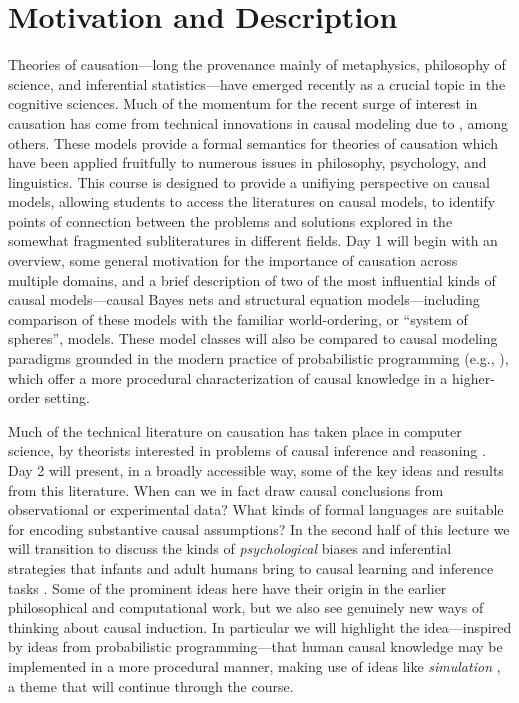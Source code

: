 \documentclass[english]{article}
\begin{document}
\section*{\large{Motivation and Description}}

Theories of causation---long the provenance mainly of metaphysics, philosophy of science, and inferential statistics---have emerged recently as a crucial topic in the cognitive sciences. Much of the momentum for the recent surge of interest in causation has come from technical innovations in causal modeling due to \citet{spirtes93,pearl00}, among others. These models provide a formal semantics for theories of causation which have been applied fruitfully to numerous issues in philosophy, psychology, and linguistics. This course is designed to provide a unifiying perspective on causal models, allowing students to access the literatures on causal models, to identify points of connection between the problems and solutions explored in the somewhat fragmented subliteratures in different fields. Day 1 will begin with an overview, some general motivation for the importance of causation across multiple domains, and a brief description of two of the most influential kinds of causal models---causal Bayes nets and structural equation models---including comparison of these models with the familiar world-ordering, or ``system of spheres'', models. These model classes will also be compared to causal modeling paradigms grounded in the modern practice of probabilistic programming (e.g., \citealt{goodmanetal15}), which offer a more procedural characterization of causal knowledge in a higher-order setting. 

Much of the technical literature on causation has taken place in computer science, by theorists interested in problems of causal inference and reasoning \citep{spirtes93,pearl00,Peters,BCII2020}. Day 2 will present, in a broadly accessible way, some of the key ideas and results from this literature. When can we in fact draw causal conclusions from observational or experimental data? What kinds of formal languages are suitable for encoding substantive causal assumptions? In the second half of this lecture we will transition to discuss the kinds of \emph{psychological} biases and inferential strategies that infants and adult humans bring to causal learning and inference tasks \citep{glymour01,gopnik04,gopnikschultz07}. Some of the prominent ideas here have their origin in the earlier philosophical and computational work, but we also see genuinely new ways of thinking about causal induction. In particular we will highlight the idea---inspired by ideas from probabilistic programming---that human causal knowledge may be implemented in a more procedural manner, making use of ideas like \emph{simulation} \citep{gerstenberg21}, a theme that will continue through the course.
\end{document}

